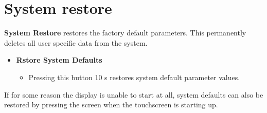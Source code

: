 \documentclass[12pt,a4paper,english]{uvmanual}
\begin{document}
\section{System restore}\label{ch:system_restore}

\textbf{System Restore} restores the factory default parameters. This permanently deletes all user specific data from the system.


\begin{itemize}
 \item \textbf{Rstore System Defaults}
 \begin{itemize}
  \item Pressing this button 10 s restores system default parameter values.
 \end{itemize}
\end{itemize}

If for some reason the display is unable to start at all, system defaults can also be restored by pressing the screen when the touchscreen is starting up.
\end{document}
